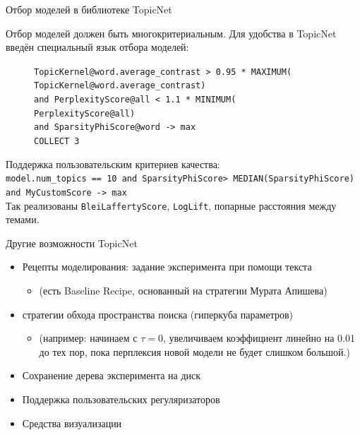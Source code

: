 \begin{frame}{Отбор моделей в библиотеке TopicNet}

Отбор моделей должен быть многокритериальным. Для удобства в TopicNet введён специальный язык отбора моделей:

\begin{figure}[ht]
\raggedright
\texttt{TopicKernel@word.average\_contrast > 0.95 * MAXIMUM( \\
\hphantom{\ \ \ \ \ \ \ \ }TopicKernel@word.average\_contrast) \\
\hphantom{\ \ } and PerplexityScore@all < 1.1 * MINIMUM( \\
\hphantom{\ \ \ \ \ \ \ \ }PerplexityScore@all) \\
\hphantom{\ \ } and SparsityPhiScore@word -> max\\
\hphantom{\ \ } COLLECT 3} \\
\label{DSL-example}
\end{figure} 
	

\bigskip
Поддержка пользовательским критериев качества:\\
\medskip
\texttt{model.num\_topics == 10 and SparsityPhiScore\@word > MEDIAN(SparsityPhiScore\@word) and MyCustomScore -> max}\\
\medskip
Так реализованы \texttt{BleiLaffertyScore}, \texttt{LogLift}, попарные расстояния между темами.
\end{frame}

\begin{frame}{Другие возможности TopicNet}
\begin{itemize}
    \item{Рецепты моделирования: задание эксперимента при помощи текста}
    \begin{itemize}
        \item (есть Baseline Recipe, основанный на стратегии Мурата Апишева) 
    \end{itemize}
    \item{стратегии обхода пространства поиска (гиперкуба параметров)}
    \begin{itemize}
        \item (например: начинаем с $\tau=0$, увеличиваем коэффициент линейно на 0.01 до тех пор, пока перплексия новой модели не будет слишком большой.) 
    \end{itemize}
    \item{Сохранение дерева эксперимента на диск}
    \item{Поддержка пользовательских регуляризаторов}
    \item{Средства визуализации}
\end{itemize}

\end{frame}

